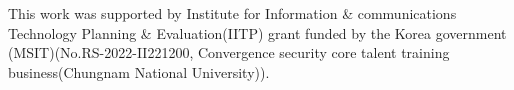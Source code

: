 \documentclass[preprint, 12pt]{elsarticle}%
\begin{document}
This work was supported by Institute for Information \& communications
Technology Planning \& Evaluation(IITP) grant funded by the Korea government
(MSIT)(No.RS-2022-II221200, Convergence security core talent training
business(Chungnam National University)).


\clearpage





\end{document}

